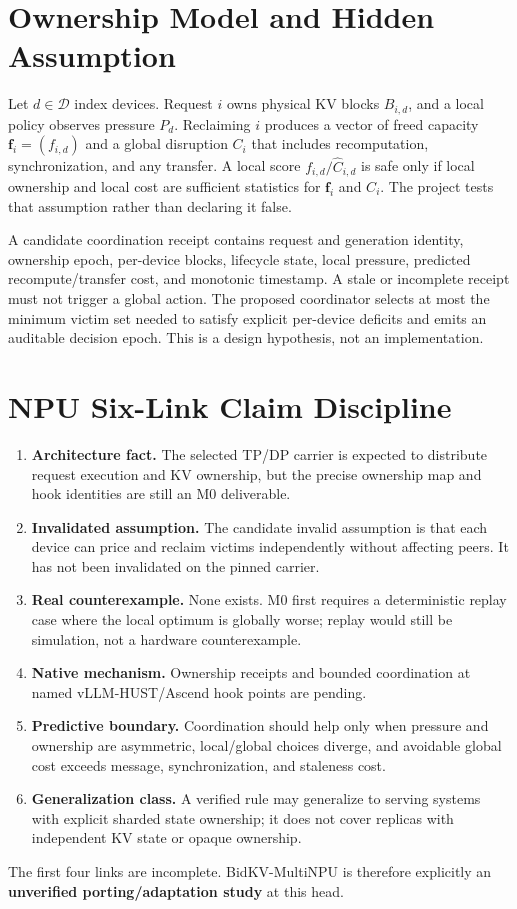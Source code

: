 \documentclass[10pt]{article}
\begin{document}
\section{Ownership Model and Hidden Assumption}
Let $d\in\mathcal D$ index devices.  Request $i$ owns physical KV blocks
$B_{i,d}$, and a local policy observes pressure $P_d$.  Reclaiming $i$ produces
a vector of freed capacity $\mathbf f_i=(f_{i,d})$ and a global disruption
$C_i$ that includes recomputation, synchronization, and any transfer.  A local
score $f_{i,d}/\widehat C_{i,d}$ is safe only if local ownership and local cost
are sufficient statistics for $\mathbf f_i$ and $C_i$.  The project tests that
assumption rather than declaring it false.

A candidate coordination receipt contains request and generation identity,
ownership epoch, per-device blocks, lifecycle state, local pressure, predicted
recompute/transfer cost, and monotonic timestamp.  A stale or incomplete receipt
must not trigger a global action.  The proposed coordinator selects at most the
minimum victim set needed to satisfy explicit per-device deficits and emits an
auditable decision epoch.  This is a design hypothesis, not an implementation.

\section{NPU Six-Link Claim Discipline}
\begin{enumerate}
\item \textbf{Architecture fact.} The selected TP/DP carrier is expected to
distribute request execution and KV ownership, but the precise ownership map and
hook identities are still an M0 deliverable.
\item \textbf{Invalidated assumption.} The candidate invalid assumption is that
each device can price and reclaim victims independently without affecting peers.
It has not been invalidated on the pinned carrier.
\item \textbf{Real counterexample.} None exists.  M0 first requires a
deterministic replay case where the local optimum is globally worse; replay
would still be simulation, not a hardware counterexample.
\item \textbf{Native mechanism.} Ownership receipts and bounded coordination at
named vLLM-HUST/Ascend hook points are pending.
\item \textbf{Predictive boundary.} Coordination should help only when pressure
and ownership are asymmetric, local/global choices diverge, and avoidable global
cost exceeds message, synchronization, and staleness cost.
\item \textbf{Generalization class.} A verified rule may generalize to serving
systems with explicit sharded state ownership; it does not cover replicas with
independent KV state or opaque ownership.
\end{enumerate}
The first four links are incomplete.  BidKV-MultiNPU is therefore explicitly an
\textbf{unverified porting/adaptation study} at this head.
\end{document}

